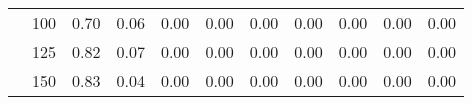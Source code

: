 \begin{table}[t]
\begin{center}
\begin{subtable}[c]{\textwidth}
\begin{center}
\begin{tabular}{rcccccccccc}
                                        & \multicolumn{1}{c|}{100}  & \num{0.70}  & \num{0.06}  & \num{0.00}  & \num{0.00}  & \num{0.00}  & \num{0.00}  & \num{0.00}  & \num{0.00}  & \num{0.00}  \\
                                        & \multicolumn{1}{c|}{125}  & \num{0.82}  & \num{0.07}  & \num{0.00}  & \num{0.00}  & \num{0.00}  & \num{0.00}  & \num{0.00}  & \num{0.00}  & \num{0.00}  \\
                                        & \multicolumn{1}{c|}{150}  & \num{0.83}  & \num{0.04}  & \num{0.00}  & \num{0.00}  & \num{0.00}  & \num{0.00}  & \num{0.00}  & \num{0.00}  & \num{0.00}  \\
                                    \end{tabular}
            \end{center}
        \end{subtable}

        \vspace{5mm}


\end{center}
\end{table}
